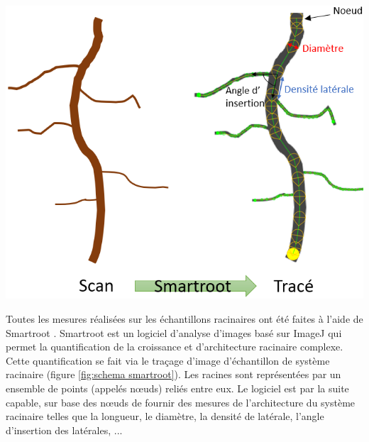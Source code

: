 \begin{minipage}{0.5\linewidth}
\captionsetup{type=figure,hypcap=true}
\centering
\includegraphics[width=1\linewidth]{Image/schema smartroot.png}
\label{fig:schema smartroot}
\end{minipage}\hfill
\begin{minipage}{0.45\linewidth}
Toutes les mesures réalisées sur les échantillons racinaires ont été faites à l'aide de Smartroot \citep{lobet_novel_2011}.
Smartroot est un logiciel d'analyse d'images basé sur ImageJ qui permet la quantification de la croissance et d'architecture racinaire complexe.
Cette quantification se fait via le traçage d'image d'échantillon de système racinaire (figure \ref{fig:schema smartroot}).
Les racines sont représentées par un ensemble de points (appelés nœuds) reliés entre eux.
Le logiciel est par la suite capable, sur base des nœuds de fournir des mesures de l'architecture du système racinaire telles que la longueur, le diamètre, la densité de latérale, l'angle d'insertion des latérales, ...
\end{minipage} 
\newline

